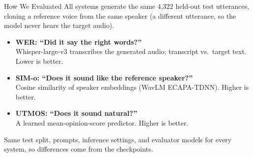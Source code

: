 \documentclass[aspectratio=169]{beamer}
\begin{document}
\begin{frame}{How We Evaluated}
  All systems generate the same 4,322 held-out test utterances, cloning a reference voice from the same speaker (a different utterance, so the model never hears the target audio).

  \vspace{0.6em}

  \begin{itemize}
    \item \textbf{WER: ``Did it say the right words?''}\\
    Whisper-large-v3 transcribes the generated audio; transcript vs.\ target text. Lower is better.
    \item \textbf{SIM-o: ``Does it sound like the reference speaker?''}\\
    Cosine similarity of speaker embeddings (WavLM ECAPA-TDNN). Higher is better.
    \item \textbf{UTMOS: ``Does it sound natural?''}\\
    A learned mean-opinion-score predictor. Higher is better.
  \end{itemize}

  \vspace{0.4em}
  \small Same test split, prompts, inference settings, and evaluator models for every system, so differences come from the checkpoints.
\end{frame}
\end{document}
